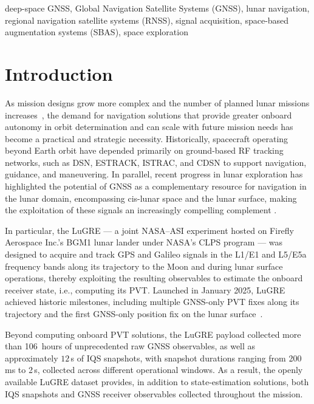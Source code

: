 \documentclass{IEEEtaes}
\begin{document}
\begin{IEEEkeywords}
deep-space GNSS,
Global Navigation Satellite Systems (GNSS),
lunar navigation,
regional navigation satellite systems (RNSS),
signal acquisition,
space-based augmentation systems (SBAS),
space exploration
\end{IEEEkeywords}




\section{Introduction}
As mission designs grow more complex and the number of planned lunar missions increases~\cite{spacenews_novaspace_2025}, the demand for navigation solutions that provide greater onboard autonomy in orbit determination and can scale with future mission needs has become a practical and strategic necessity. Historically, spacecraft operating beyond Earth orbit have depended primarily on ground-based \gls{RF} tracking networks, such as \gls{DSN}, \gls{ESTRACK}, \gls{ISTRAC}, and \gls{CDSN} to support navigation, guidance, and maneuvering. In parallel, recent progress in lunar exploration has highlighted the potential of \gls{GNSS} as a complementary resource for navigation in the lunar domain, encompassing cis-lunar space and the lunar surface, making the exploitation of these signals an increasingly compelling complement \cite{JournalDiMissione}.

In particular, the \gls{LuGRE} \cite{parker2022lunar, konitzer2024science} --- a joint NASA–ASI experiment hosted on Firefly Aerospace Inc.'s \gls{BGM1} lunar lander under NASA’s \gls{CLPS} program ---  was designed to acquire and track \gls{GPS} and Galileo signals in the L1/E1 and L5/E5a frequency bands along its trajectory to the Moon and during lunar surface operations, thereby exploiting the resulting observables to estimate the onboard receiver state, i.e., computing its \gls{PVT}. Launched in January 2025, \gls{LuGRE} achieved historic milestones, including multiple GNSS-only \gls{PVT} fixes along its trajectory and the first GNSS-only position fix on the lunar surface~\cite{JournalDiMissione}.

Beyond computing onboard \gls{PVT} solutions, the \gls{LuGRE} payload \cite{tedesco2023deep, pulliero2023space} collected more than 106~hours of unprecedented raw GNSS observables, as well as approximately $12$\,s of \gls{IQS} snapshots, with snapshot durations ranging from 200\,ms to 2\,s, collected across different operational windows. As a result, the openly available LuGRE dataset \cite{parker2025lunar} provides, in addition to state-estimation solutions, both \gls{IQS} snapshots and \gls{GNSS} receiver observables collected throughout the mission.
\end{document}
